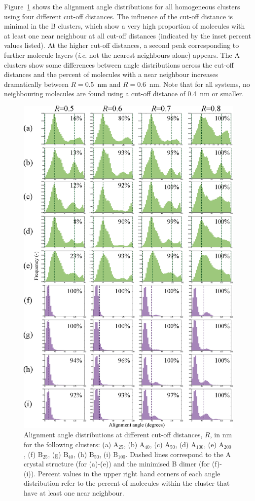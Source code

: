 Figure~\ref{figSI:alignmentangles_cutoffs} shows the alignment angle distributions for all homogeneous clusters using four different cut-off distances.  The influence of the cut-off distance is minimal in the B clusters, which show a very high proportion of molecules with at least one near neighbour at all cut-off distances (indicated by the inset percent values listed).  At the higher cut-off distances, a second peak corresponding to further molecule layers (\textit{i}.\textit{e}. not the nearest neighbours alone) appears.  The A clusters show some differences between angle distributions across the cut-off distances and the percent of molecules with a near neighbour increases dramatically between $R=0.5$~nm and $R=0.6$~nm. Note that for all systems, no neighbouring molecules are found using a cut-off distance of 0.4~nm or smaller.
%
\begin{figure}[!h]
\centering
\includegraphics[width=0.75\linewidth]{Figures/AlignmentAnglesCutoffAssessment_SI.eps}
\caption{Alignment angle distributions at different cut-off distances, $R$, in nm for the following clusters: (a) $\text{A}_{\text{25}}$, (b) $\text{A}_{\text{40}}$, (c) $\text{A}_{\text{50}}$, (d) $\text{A}_{\text{100}}$, (e) $\text{A}_{\text{200}}$, (f) $\text{B}_{\text{25}}$, (g) $\text{B}_{\text{40}}$, (h) $\text{B}_{\text{50}}$, (i) $\text{B}_{\text{100}}$. Dashed lines correspond to the A crystal structure (for (a)-(e)) and the minimised B dimer (for (f)-(i)). Percent values in the upper right hand corners of each angle distribution refer to the percent of molecules within the cluster that have at least one near neighbour.}
\label{figSI:alignmentangles_cutoffs}
\end{figure}

